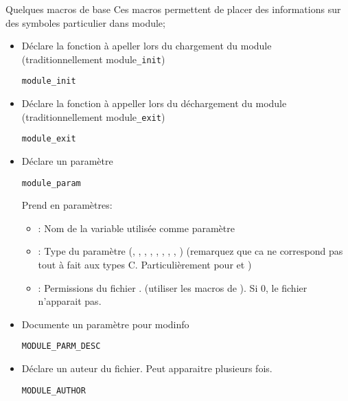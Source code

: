 \begin{frame}[fragile=singleslide]{Quelques macros de base}
  Ces macros  permettent de placer  des informations sur  des symboles
  particulier dans module;
  \begin{itemize} 
  \item Déclare  la fonction  à apeller lors  du chargement  du module
  (traditionnellement module\texttt{\_init})
    \begin{lstlisting} 
module_init
    \end{lstlisting} 
  \item Déclare la fonction à  appeller lors du déchargement du module
  (traditionnellement module\texttt{\_exit})
    \begin{lstlisting} 
module_exit
    \end{lstlisting} 
  \item Déclare un paramètre
    \begin{lstlisting}
module_param
    \end{lstlisting}
    Prend en paramètres:
    \begin{itemize} 
      \item {}: Nom de la variable utilisée comme paramètre
      \item  {}: Type  du paramètre  (, ,
        , ,  , , ,
        , )  (remarquez que ca  ne correspond pas
        tout à  fait aux types C. Particulièrement  pour  et
        )
      \item       {}:       Permissions       du       fichier
        .  (utiliser les
        macros  de ). Si  0, le  fichier n'apparait
        pas.
      \end{itemize} 
  \item Documente un paramètre pour modinfo
    \begin{lstlisting}
MODULE_PARM_DESC
    \end{lstlisting}
  \item Déclare un auteur du fichier. Peut apparaitre plusieurs fois.
    \begin{lstlisting}
MODULE_AUTHOR
    \end{lstlisting}
  \end{itemize}
\end{frame}
